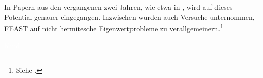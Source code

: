 In Papern aus den vergangenen zwei Jahren, wie etwa in \cite[Abschnitt 4.1]{kpt}, wird auf dieses Potential genauer eingegangen. Inzwischen wurden auch Versuche unternommen, FEAST auf nicht hermitesche Eigenwertprobleme zu verallgemeinern.\footnote{Siehe \cite{kpt}.}

\newpage
\textcolor{white}{blind}

